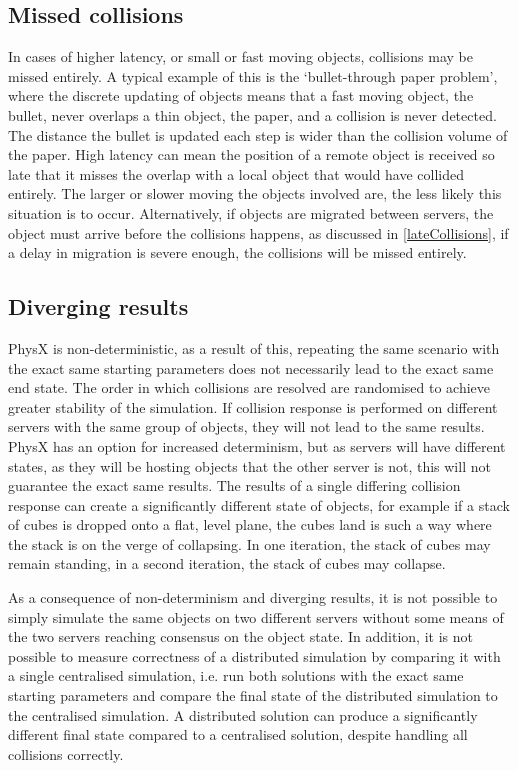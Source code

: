 \subsection{Missed collisions}
In cases of higher latency, or small or fast moving objects, collisions may be missed entirely. A typical example of this is the `bullet-through paper problem', where the discrete updating of objects means that a fast moving object, the bullet, never overlaps a thin object, the paper, and a collision is never detected. The distance the bullet is updated each step is wider than the collision volume of the paper. High latency can mean the position of a remote object is received so late that it misses the overlap with a local object that would have collided entirely. The larger or slower moving the objects involved are, the less likely this situation is to occur. Alternatively, if objects are migrated between servers, the object must arrive before the collisions happens, as discussed in \ref{lateCollisions}, if a delay in migration is severe enough, the collisions will be missed entirely.

\subsection{Diverging results}\label{divergingResults}
PhysX is non-deterministic, as a result of this, repeating the same scenario with the exact same starting parameters does not necessarily lead to the exact same end state. The order in which collisions are resolved are randomised to achieve greater stability of the simulation.
If collision response is performed on different servers with the same group of objects, they will not lead to the same results. PhysX has an option for increased determinism, but as servers will have different states, as they will be hosting objects that the other server is not, this will not guarantee the exact same results. The results of a single differing collision response can create a significantly different state of objects, for example if a stack of cubes is dropped onto a flat, level plane, the cubes land is such a way where the stack is on the verge of collapsing. In one iteration, the stack of cubes may remain standing, in a second iteration, the stack of cubes may collapse.

As a consequence of non-determinism and diverging results, it is not possible to simply simulate the same objects on two different servers without some means of the two servers reaching consensus on the object state. In addition, it is not possible to measure correctness of a distributed simulation by comparing it with a single centralised simulation, i.e. run both solutions with the exact same starting parameters and compare the final state of the distributed simulation to the centralised simulation. A distributed solution can produce a significantly different final state compared to a centralised solution, despite handling all collisions correctly.

